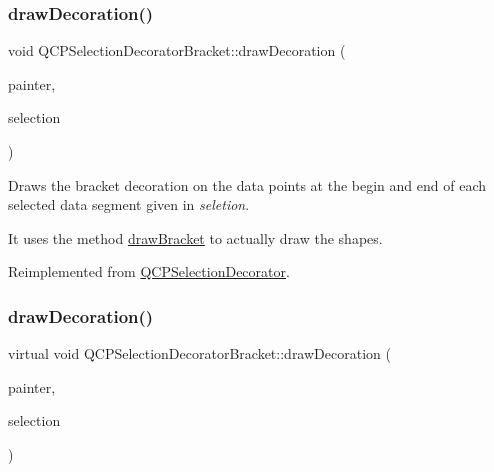 \subsubsection{\texorpdfstring{draw\+Decoration()}{drawDecoration()}\hspace{0.1cm}{\footnotesize\ttfamily [1/2]}}
{\footnotesize\ttfamily void Q\+C\+P\+Selection\+Decorator\+Bracket\+::draw\+Decoration (\begin{DoxyParamCaption}\item[{\hyperlink{class_q_c_p_painter}{Q\+C\+P\+Painter} $\ast$}]{painter,  }\item[{\hyperlink{class_q_c_p_data_selection}{Q\+C\+P\+Data\+Selection}}]{selection }\end{DoxyParamCaption})\hspace{0.3cm}{\ttfamily [virtual]}}

Draws the bracket decoration on the data points at the begin and end of each selected data segment given in {\itshape seletion}.

It uses the method \hyperlink{class_q_c_p_selection_decorator_bracket_a57b65b5508d5bd0f27c9318f3d4646be}{draw\+Bracket} to actually draw the shapes.

Reimplemented from \hyperlink{class_q_c_p_selection_decorator_a4f8eb49e277063845391e803ae23054a}{Q\+C\+P\+Selection\+Decorator}.

\mbox{\label{class_q_c_p_selection_decorator_bracket_ae96f09ef95abf81a2514d54149387097}} 
\subsubsection{\texorpdfstring{draw\+Decoration()}{drawDecoration()}\hspace{0.1cm}{\footnotesize\ttfamily [2/2]}}
{\footnotesize\ttfamily virtual void Q\+C\+P\+Selection\+Decorator\+Bracket\+::draw\+Decoration (\begin{DoxyParamCaption}\item[{\hyperlink{class_q_c_p_painter}{Q\+C\+P\+Painter} $\ast$}]{painter,  }\item[{\hyperlink{class_q_c_p_data_selection}{Q\+C\+P\+Data\+Selection}}]{selection }\end{DoxyParamCaption})\hspace{0.3cm}{\ttfamily [virtual]}}

